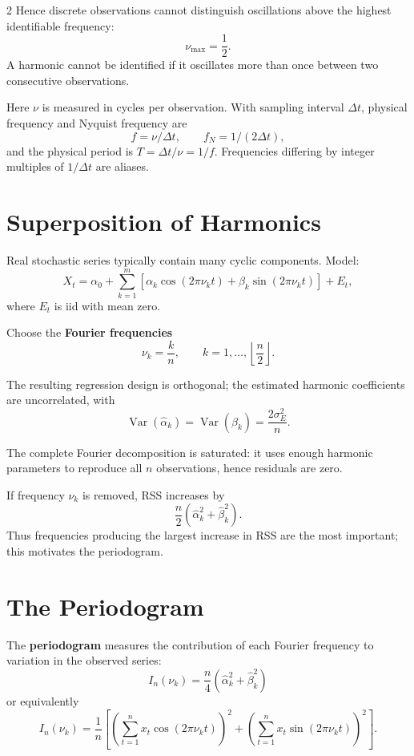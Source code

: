 \documentclass[9pt,a4paper]{extarticle}
\newcommand{\key}[1]{\textbf{#1}}
\begin{document}
\begin{multicols}{2}
Hence discrete observations cannot distinguish oscillations above the highest identifiable frequency:
\[
\boxed{\nu_{\max}=\frac12}.
\]
A harmonic cannot be identified if it oscillates more than once between two consecutive observations.

Here \(\nu\) is measured in cycles per observation. With sampling interval \(\Delta t\), physical frequency and Nyquist frequency are
\[
\boxed{f=\nu/\Delta t,\qquad f_N=1/(2\Delta t)},
\]
and the physical period is \(T=\Delta t/\nu=1/f\). Frequencies differing by integer multiples of \(1/\Delta t\) are aliases.

\section{Superposition of Harmonics}

Real stochastic series typically contain many cyclic components. Model:
\[
\boxed{
X_t=
\alpha_0+
\sum_{k=1}^{m}
\left[
\alpha_k\cos(2\pi\nu_kt)
+
\beta_k\sin(2\pi\nu_kt)
\right]
+E_t,
}
\]
where \(E_t\) is iid with mean zero.

Choose the \key{Fourier frequencies}
\[
\boxed{
\nu_k=\frac{k}{n},
\qquad
k=1,\ldots,\left\lfloor\frac n2\right\rfloor.
}
\]

The resulting regression design is orthogonal; the estimated harmonic coefficients are uncorrelated, with
\[
\operatorname{Var}(\widehat\alpha_k)
=
\operatorname{Var}(\widehat\beta_k)
=
\frac{2\sigma_E^2}{n}.
\]

The complete Fourier decomposition is saturated: it uses enough harmonic parameters to reproduce all \(n\) observations, hence residuals are zero.

If frequency \(\nu_k\) is removed, RSS increases by
\[
\boxed{
\frac n2
\left(
\widehat\alpha_k^2+\widehat\beta_k^2
\right).
}
\]
Thus frequencies producing the largest increase in RSS are the most important; this motivates the periodogram.

\section{The Periodogram}

The \key{periodogram} measures the contribution of each Fourier frequency to variation in the observed series:
\[
\boxed{
I_n(\nu_k)
=
\frac n4
\left(
\widehat\alpha_k^2+\widehat\beta_k^2
\right)
}
\]
or equivalently
\[
\boxed{
I_n(\nu_k)=
\frac1n
\left[
\left(
\sum_{t=1}^{n}
x_t\cos(2\pi\nu_kt)
\right)^2
+
\left(
\sum_{t=1}^{n}
x_t\sin(2\pi\nu_kt)
\right)^2
\right].
}
\]


\end{multicols}
\end{document}
